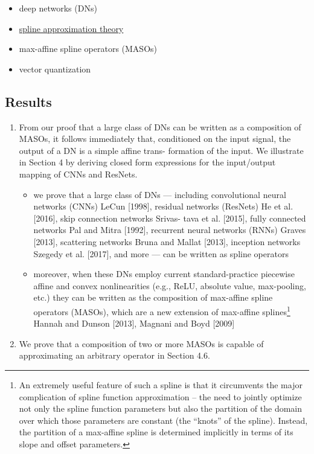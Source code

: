\documentclass{article}
\begin{document}
\begin{itemize}
	\item deep networks (DNs)
	\item \href{https://www.encyclopediaofmath.org/index.php/Spline_approximation}{spline approximation theory}
	\item max-affine spline operators (MASOs)
	\item vector quantization
\end{itemize}


\subsection{Results}

\begin{enumerate}
	\item From our proof that a large class of DNs can be written as a composition of MASOs, it follows immediately that, conditioned on the input signal, the output of a DN is a simple affine trans- formation of the input. We illustrate in Section 4 by deriving closed form expressions for the input/output mapping of CNNs and ResNets.
		\begin{itemize}
		\item we prove that a large class of DNs — including convolutional neural networks (CNNs) LeCun [1998], residual networks (ResNets) He et al. [2016], skip connection networks Srivas- tava et al. [2015], fully connected networks Pal and Mitra [1992], recurrent neural networks (RNNs) Graves [2013], scattering networks Bruna and Mallat [2013], inception networks Szegedy et al. [2017], and more — can be written as spline operators
		\item moreover, when these DNs employ current standard-practice piecewise affine and convex nonlinearities (e.g., ReLU, absolute value, max-pooling, etc.) they can be written as the composition of max-affine spline operators (MASOs), which are a new extension of max-affine splines\footnote{An extremely useful feature of such a spline is that it circumvents the major complication of spline function approximation – the need to jointly optimize not only the spline function parameters but also the partition of the domain over which those parameters are constant (the “knots” of the spline). Instead, the partition of a max-affine spline is determined implicitly in terms of its slope and offset parameters.} Hannah and Dunson [2013], Magnani and Boyd [2009]
	\end{itemize}
	\item We prove that a composition of two or more MASOs is capable of approximating an arbitrary operator in Section 4.6.

\end{enumerate}
\end{document}
